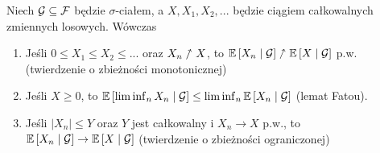 \begin{theorem}
  Niech $\mathcal{G}\subseteq\mathcal{F}$ będzie $\sigma$-ciałem, a $X,X_1, X_2,...$ będzie ciągiem całkowalnych zmiennych losowych. Wówczas
  \begin{enumerate}[topsep=8pt, parsep=8pt]
    \item Jeśli $0\leq X_1\leq X_2\leq ...$ oraz $X_n\nnearrow X$, to $\expected{X_n}{\set{G}}\nnearrow\expected{X}{\set{G}}$ p.w. (twierdzenie o zbieżności monotonicznej)
    \item Jeśli $X\geq0$, to $\expected{\liminf_n X_n}{\set{G}}\leq\liminf_n\expected{X_n}{\set{G}}$ (lemat Fatou).
    \item Jeśli $|X_n|\leq Y$ oraz $Y$ jest całkowalny i $X_n\to X$ p.w., to $\expected{X_n}{\set{G}}\to\expected{X}{\set{G}}$ (twierdzenie o zbieżności ograniczonej)
  \end{enumerate}
\end{theorem}

